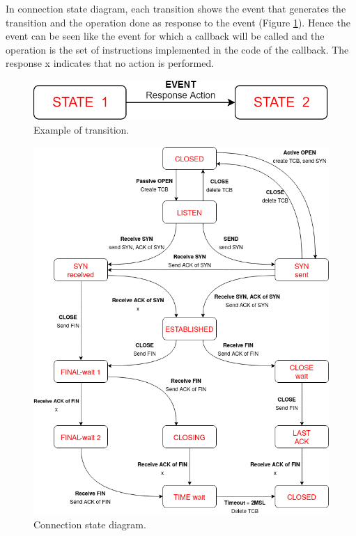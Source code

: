 In connection state diagram, each transition shows the event that generates the transition and the operation done as response to the event (Figure \ref{transition}). Hence the event can be seen like the event for which a callback will be called and the operation is the set of instructions implemented in the code of the callback. The response x indicates that no action is performed.\\

\begin{figure}[H]
\centering\footnotesize
\includegraphics[scale=0.3]{Images/Transport/transition}
\caption{Example of transition.}\label{transition}
\end{figure}

\begin{figure}[H]
\centering\footnotesize
\includegraphics[scale=0.58]{Images/Transport/finite_state}
\caption{Connection state diagram.}\label{connection_state}
\end{figure}
\vspace{2cm}
